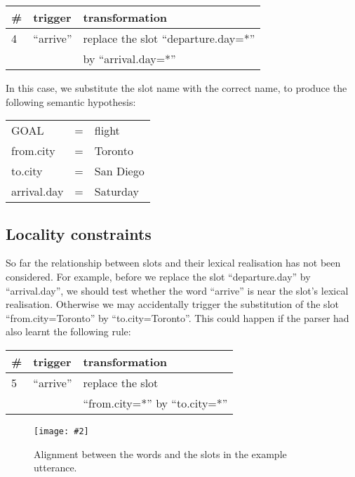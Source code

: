 \documentclass{article}
\newcommand{\fgrparam}[4]{
  \begin{figure}[htbp]
    \begin{center}
      \leavevmode
      \texttt{[image: \#2]}
    \end{center}
    \vspace{-0.5cm}
    \caption{#4}
    \label{#3}
  \end{figure}
}
\begin{document}
\vspace{.15cm}
\begin{tabular}{lll}
  \# & trigger & transformation \\
  \hline 
  4 & ``arrive''            & replace the slot ``departure.day=*'' \\
    &                       & by ``arrival.day=*'' \\
\end{tabular} 
\vspace{.15cm}

In this case, we substitute the slot name with the correct name, to produce the following semantic hypothesis:

\vspace{.15cm}
\begin{tabular}{lll}
  GOAL          & = & flight \\
  from.city     & = & Toronto \\
  to.city       & = & San Diego \\
  arrival.day   & = & Saturday \\
\end{tabular} 

\subsection{Locality constraints} \label{sec:locality:constrain}
So far the relationship between slots and their lexical realisation has not been considered. For example, before we replace the slot ``departure.day'' by ``arrival.day'', we should test whether the word ``arrive'' is near the slot's lexical realisation. Otherwise we may accidentally trigger the substitution of the slot ``from.city=Toronto'' by ``to.city=Toronto''. This could happen if the parser had also learnt the following rule:

\vspace{.15cm}
\begin{tabular}{lll}
  \# & trigger & transformation \\
  \hline 
  5 & ``arrive''   & replace the slot \\
    &              & ``from.city=*'' by ``to.city=*'' \\
\end{tabular} 
\vspace{.15cm}
\fgrparam{width=8cm}{./fig/words-slots-alignment.pdf}{fig:alignment}{Alignment between the words and the slots in the example utterance.}

\end{document}
